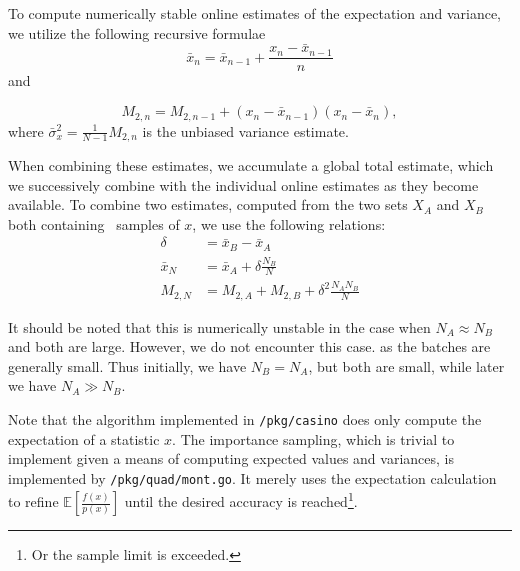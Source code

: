 \documentclass[10pt, a4paper]{article}
\begin{document}

  To compute numerically stable online estimates of the expectation and variance, we utilize the
  following recursive formulae
  \begin{equation}
  \bar{x}_n = \bar{x}_{n-1} + \frac{x_n - \bar{x}_{n-1}}{n}
  \end{equation}
  and

  \begin{equation}
  M_{2,n} = M_{2,n-1} + (x_n - \bar{x}_{n-1})(x_n - \bar{x}_n),
  \end{equation}
  where $\bar{\sigma}_x^2 = \frac{1}{N-1} M_{2,n}$ is the unbiased variance estimate\cite{welford}.

  When combining these estimates, we accumulate a global total estimate, which we successively combine
  with the individual online estimates as they become available. To combine two estimates, computed
  from the two sets $X_A$ and $X_B$ both containing \iid{} samples of $x$, we use the following relations\cite{chan}:
  \begin{equation}
  \begin{split}
  \delta & = \bar{x}_B - \bar{x}_A \\
  \bar{x}_N & = \bar{x}_A + \delta \frac{N_B}{N} \\
  M_{2,N} & = M_{2,A} + M_{2,B} + \delta^2 \frac{N_A N_B}{N}
  \end{split}
  \end{equation}

  It should be noted that this is numerically unstable in the case when $N_A \approx N_B$ and both
  are large\cite{chan}. However, we do not encounter this case. as the batches are generally small.
  Thus initially, we have $N_B = N_A$, but both are small, while later we have $N_A \gg N_B$.

  Note that the algorithm implemented in \texttt{/pkg/casino} does only compute the expectation of a
  statistic $x$. The importance sampling, which is trivial to implement given a means of computing
  expected values and variances, is implemented by \texttt{/pkg/quad/mont.go}. It merely uses the
  expectation calculation to refine $\mathbb{E}\left[ \frac{f(x)}{p(x)} \right]$ until the desired
  accuracy is reached\footnote{Or the sample limit is exceeded.}.
\end{document}
